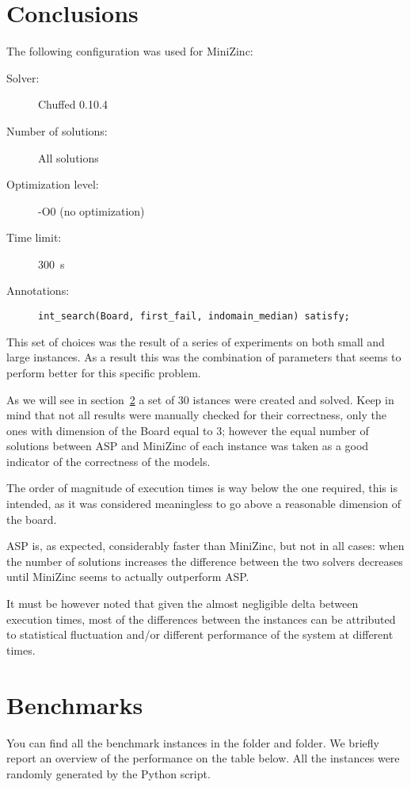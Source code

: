 \section{Conclusions}
The following configuration was used for MiniZinc:
\begin{description}
    \item[Solver: ] Chuffed 0.10.4
    \item[Number of solutions: ] All solutions
    \item[Optimization level: ] -O0 (no optimization)
    \item[Time limit: ] \SI{300}{s}
    \item[Annotations: ] \texttt{int_search(Board, first_fail, indomain_median) satisfy;}
\end{description}

This set of choices was the result of a series of experiments on both small and large instances. As a result this was the combination of parameters that seems to perform better for this specific problem.


As we will see in section~\ref{sec:benchmarks} a set of 30 istances were created and solved. Keep in mind that not all results were manually checked for their correctness, only the ones with dimension of the Board equal to 3; however the equal number of solutions between ASP and MiniZinc of each instance was taken as a good indicator of the correctness of the models.

The order of magnitude of execution times is way below the one required, this is intended, as it was considered meaningless to go above a reasonable dimension of the board.

ASP is, as expected, considerably faster than MiniZinc, but not in all cases: when the number of solutions increases the difference between the two solvers decreases until MiniZinc seems to actually outperform ASP. 

It must be however noted that given the almost negligible delta between execution times, most of the differences between the instances can be attributed to statistical fluctuation and/or different performance of the system at different times.

\section{Benchmarks}\label{sec:benchmarks}
You can find all the benchmark instances in the  folder and  folder. We briefly report an overview of the performance on the table below. All the instances were randomly generated by the Python script. 


